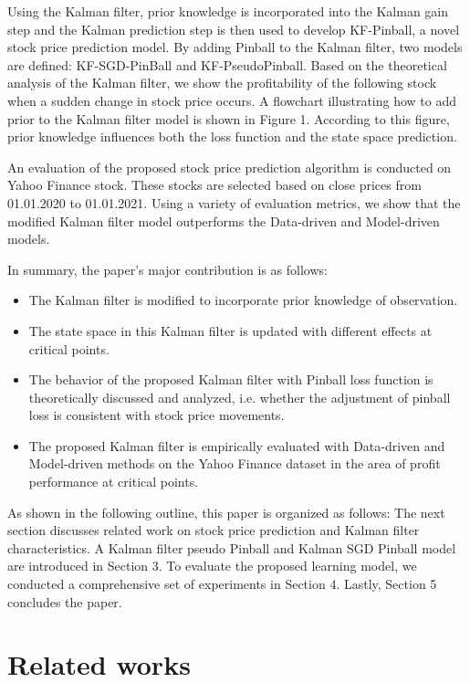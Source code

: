 \documentclass[12pt,a4paper]{article}
\begin{document}
	Using the Kalman filter, prior knowledge is incorporated into the Kalman gain step and the Kalman prediction step is then used to develop KF-Pinball, a novel stock price prediction model. By adding Pinball to the Kalman filter, two models are defined: KF-SGD-PinBall and KF-PseudoPinball. Based on the theoretical analysis of the Kalman filter, we show the profitability of the following stock when a sudden change in stock price occurs. A flowchart illustrating how to add prior to the Kalman filter model is shown in Figure 1. According to this figure, prior knowledge influences both the loss function and the state space prediction.
	
	An evaluation of the proposed stock price prediction algorithm is conducted on Yahoo Finance stock. These stocks are selected based on close prices from 01.01.2020 to 01.01.2021. Using a variety of evaluation metrics, we show that the modified Kalman filter model outperforms the Data-driven and Model-driven models.
	
	In summary, the paper's major contribution is as follows:
	\begin{itemize}
		\item The Kalman filter is modified to incorporate prior knowledge of observation.
		\item The state space in this Kalman filter is updated with different effects at critical points.
		\item The behavior of the proposed Kalman filter with Pinball loss function is theoretically discussed and analyzed, i.e. whether the adjustment of pinball loss is consistent with stock price movements.
		\item The proposed Kalman filter is empirically evaluated with Data-driven and Model-driven methods on the Yahoo Finance dataset in the area of profit performance at critical points.
	\end{itemize}
	
	As shown in the following outline, this paper is organized as follows: The next section discusses related work on stock price prediction and Kalman filter characteristics. A Kalman filter pseudo Pinball and Kalman SGD Pinball model are introduced in Section 3. To evaluate the proposed learning model, we conducted a comprehensive set of experiments in Section 4. Lastly, Section 5 concludes the paper.
	
	\section{Related works}
	
\end{document}
